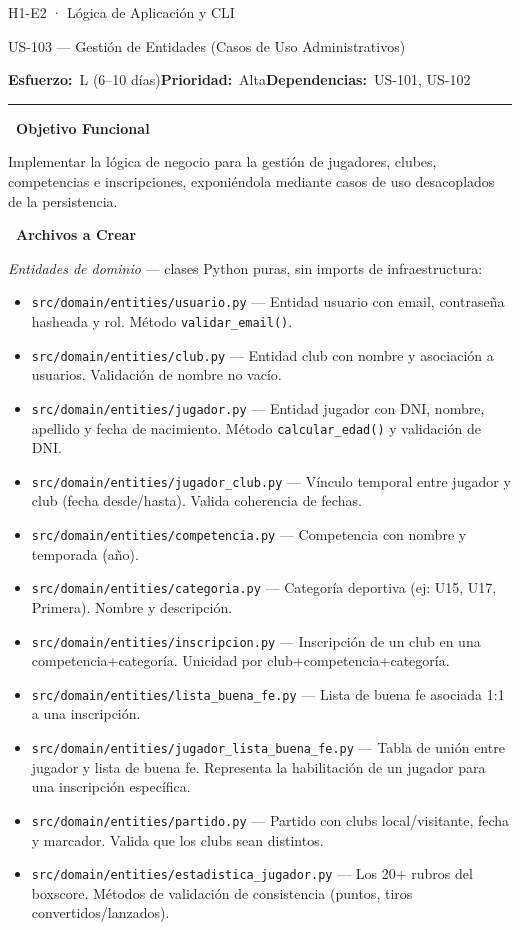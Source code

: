 \documentclass[11pt,a4paper]{article}
\newcommand{\fpath}[1]{\texttt{\small #1}}
\newcommand{\usfield}[2][\;]{%
  \par\vspace{5pt}%
  {\small\textbf{\textcolor{primary}{#2}}}\par\vspace{2pt}%
}
\newcommand{\usmeta}[3]{%
  \vspace{2pt}%
  {\small\textcolor{secondary}{%
    \textbf{Esfuerzo:}~#1\quad\textbf{Prioridad:}~#2\quad\textbf{Dependencias:}~#3%
  }}%
  \par\vspace{4pt}%
  \textcolor{bordergray}{\rule{\linewidth}{0.4pt}}\par\vspace{4pt}%
}
\begin{document}
\begin{epicbox}{H1-E2 · Lógica de Aplicación y CLI}
\end{epicbox}

\begin{uscard}{US-103 — Gestión de Entidades (Casos de Uso Administrativos)}

\usmeta{L (6–10 días)}{Alta}{US-101, US-102}

\usfield{\faAlignLeft\ Objetivo Funcional}
Implementar la lógica de negocio para la gestión de jugadores, clubes, competencias e inscripciones, exponiéndola mediante casos de uso desacoplados de la persistencia.

\usfield{\faFolderOpen\ Archivos a Crear}

\textit{Entidades de dominio} — clases Python puras, sin imports de infraestructura:
\begin{itemize}[nosep, leftmargin=1.6em]
  \item \fpath{src/domain/entities/usuario.py} — Entidad usuario con email, contraseña hasheada y rol. Método \fpath{validar\_email()}.
  \item \fpath{src/domain/entities/club.py} — Entidad club con nombre y asociación a usuarios. Validación de nombre no vacío.
  \item \fpath{src/domain/entities/jugador.py} — Entidad jugador con DNI, nombre, apellido y fecha de nacimiento. Método \fpath{calcular\_edad()} y validación de DNI.
  \item \fpath{src/domain/entities/jugador\_club.py} — Vínculo temporal entre jugador y club (fecha desde/hasta). Valida coherencia de fechas.
  \item \fpath{src/domain/entities/competencia.py} — Competencia con nombre y temporada (año).
  \item \fpath{src/domain/entities/categoria.py} — Categoría deportiva (ej: U15, U17, Primera). Nombre y descripción.
  \item \fpath{src/domain/entities/inscripcion.py} — Inscripción de un club en una competencia+categoría. Unicidad por club+competencia+categoría.
  \item \fpath{src/domain/entities/lista\_buena\_fe.py} — Lista de buena fe asociada 1:1 a una inscripción.
  \item \fpath{src/domain/entities/jugador\_lista\_buena\_fe.py} — Tabla de unión entre jugador y lista de buena fe. Representa la habilitación de un jugador para una inscripción específica.
  \item \fpath{src/domain/entities/partido.py} — Partido con clubs local/visitante, fecha y marcador. Valida que los clubs sean distintos.
  \item \fpath{src/domain/entities/estadistica\_jugador.py} — Los 20+ rubros del boxscore. Métodos de validación de consistencia (puntos, tiros convertidos/lanzados).
\end{itemize}


\end{uscard}
\end{document}
